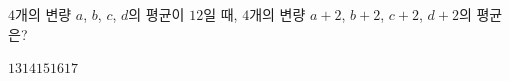 $4$개의 변량 $a$, $b$, $c$, $d$의 평균이 $12$일 때, $4$개의 변량 $a+2$, $b+2$, $c+2$, $d+2$의 평균은?
\begin{choices32}{$13$}{$14$}{$15$}{$16$}{$17$}\end{choices32}
